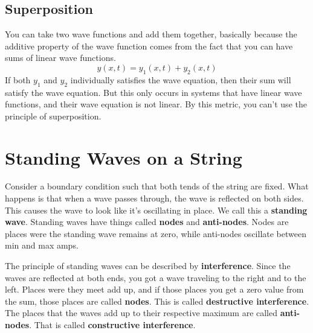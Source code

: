 \subsection{Superposition}
You can take two wave functions and add them together, basically because the additive property of the wave function comes from the fact that you can have sums of linear wave functions.
\begin{equation*}
	y(x,t) = y_1(x,t) + y_2(x,t)
\end{equation*}
If both $y_1$ and $y_2$ individually satisfies the wave equation, then their sum will satisfy the wave equation. But this only occurs in systems that have linear wave functions, and their wave equation is not linear. By this metric, you can't use the principle of superposition.

\newpage
\section{Standing Waves on a String}
Consider a boundary condition such that both tends of the string are fixed. What happens is that when a wave passes through, the wave is reflected on both sides. This causes the wave to look like it's oscillating in place. We call this a \textbf{standing wave}. Standing waves have things called \textbf{nodes} and \textbf{anti-nodes}. Nodes are places were the standing wave remains at zero, while anti-nodes oscillate between min and max amps.

The principle of standing waves can be described by \textbf{interference}. Since the waves are reflected at both ends, you got a wave traveling to the right and to the left. Places were they meet add up, and if those places you get a zero value from the sum, those places are called \textbf{nodes}. This is called \textbf{destructive interference}. The places that the waves add up to their respective maximum are called \textbf{anti-nodes}. That is called \textbf{constructive interference}.

